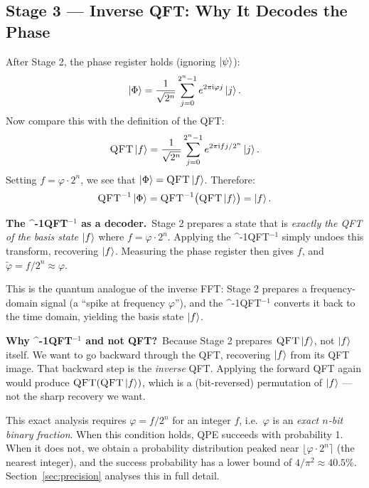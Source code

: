 \documentclass[12pt,a4paper]{article}
\newcommand{\QPE}{\textsc{QPE}}
\newcommand{\QFT}{\textsc{QFT}}
\newcommand{\IQFT}{\ifmmode \text{\textsc{QFT}}^{-1}\else \textsc{QFT}$^{-1}$\fi}
\newcommand{\ii}{\mathrm{i}}
\begin{document}
\subsection{Stage 3 — Inverse QFT: Why It Decodes the Phase}
\label{subsec:stage3}

After Stage 2, the phase register holds (ignoring $\Ket{\psi}$):
\[
  \Ket{\Phi} = \frac{1}{\sqrt{2^n}}\sum_{j=0}^{2^n-1} e^{2\pi \ii \varphi j}\Ket{j}.
\]
Now compare this with the definition of the QFT:
\[
  \QFT\Ket{f} = \frac{1}{\sqrt{2^n}}\sum_{j=0}^{2^n-1} e^{2\pi \ii fj/2^n}\Ket{j}.
\]
Setting $f = \varphi \cdot 2^n$, we see that $\Ket{\Phi} = \QFT\Ket{f}$.
Therefore:
\[
  \IQFT\Ket{\Phi} = \IQFT\bigl(\QFT\Ket{f}\bigr) = \Ket{f}.
\]

\begin{tcolorbox}[insight]
  \textbf{The \IQFT{} as a decoder.}\ Stage 2 prepares a state that is
  \emph{exactly the QFT of the basis state} $\Ket{f}$ where $f = \varphi\cdot 2^n$.
  Applying the \IQFT{} simply undoes this transform, recovering $\Ket{f}$.
  Measuring the phase register then gives $f$, and
  $\tilde\varphi = f/2^n \approx \varphi$.

  This is the quantum analogue of the inverse FFT: Stage 2 prepares a
  frequency-domain signal (a ``spike at frequency $\varphi$''), and the
  \IQFT{} converts it back to the time domain, yielding the basis state
  $\Ket{f}$.

  \medskip
  \textbf{Why \IQFT{} and not QFT?}\ Because Stage 2 prepares $\QFT\Ket{f}$,
  not $\Ket{f}$ itself.  We want to go backward through the QFT, recovering
  $\Ket{f}$ from its QFT image.  That backward step is the \emph{inverse}
  QFT.  Applying the forward QFT again would produce
  $\QFT(\QFT\Ket{f})$, which is a (bit-reversed) permutation of $\Ket{f}$
  — not the sharp recovery we want.
\end{tcolorbox}

\begin{tcolorbox}[warning]
  This exact analysis requires $\varphi = f/2^n$ for an integer $f$, i.e.\
  $\varphi$ is an \emph{exact $n$-bit binary fraction}.  When this condition
  holds, \QPE{} succeeds with probability 1.  When it does not, we obtain a
  probability distribution peaked near $\lfloor \varphi \cdot 2^n \rceil$
  (the nearest integer), and the success probability has a lower bound
  of $4/\pi^2 \approx 40.5\%$.  Section~\ref{sec:precision} analyses this
  in full detail.
\end{tcolorbox}

\newpage
\end{document}
